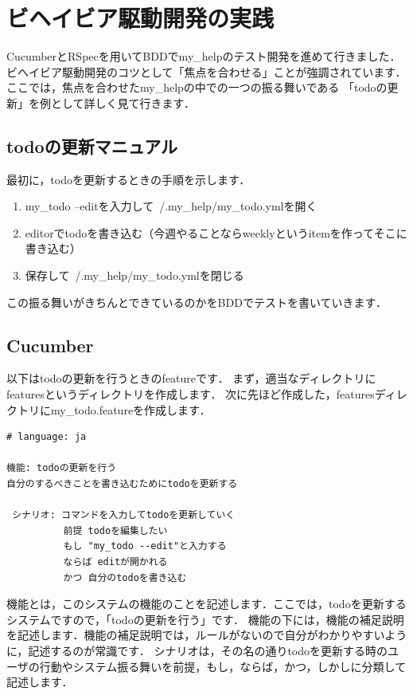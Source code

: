 
\section{ビヘイビア駆動開発の実践}
CucumberとRSpecを用いてBDDでmy\_helpのテスト開発を進めて行きました．
ビヘイビア駆動開発のコツとして「焦点を合わせる」ことが強調されています．
ここでは，焦点を合わせたmy\_helpの中での一つの振る舞いである
「todoの更新」を例として詳しく見て行きます．

\subsection{todoの更新マニュアル}
最初に，todoを更新するときの手順を示します．

\begin{enumerate}
\item my\_todo --editを入力して~/.my\_help/my\_todo.ymlを開く
\item editorでtodoを書き込む（今週やることならweeklyというitemを作ってそこに書き込む）
\item 保存して~/.my\_help/my\_todo.ymlを閉じる
\end{enumerate}
この振る舞いがきちんとできているのかをBDDでテストを書いていきます．

\subsection{Cucumber}
以下はtodoの更新を行うときのfeatureです．
まず，適当なディレクトリにfeaturesというディレクトリを作成します．
次に先ほど作成した，featuresディレクトリにmy\_todo.featureを作成します．
\begin{lstlisting}[style=customCsh,basicstyle={\scriptsize\ttfamily}]
# language: ja 

機能: todoの更新を行う
自分のするべきことを書き込むためにtodoを更新する

 シナリオ: コマンドを入力してtodoを更新していく
          前提 todoを編集したい
          もし "my_todo --edit"と入力する
          ならば editが開かれる
          かつ 自分のtodoを書き込む
\end{lstlisting}
機能とは，このシステムの機能のことを記述します．ここでは，todoを更新するシステムですので，「todoの更新を行う」です．
機能の下には，機能の補足説明を記述します．機能の補足説明では，ルールがないので自分がわかりやすいように，記述するのが常識です．
シナリオは，その名の通りtodoを更新する時のユーザの行動やシステム振る舞いを前提，もし，ならば，かつ，しかしに分類して記述します．

